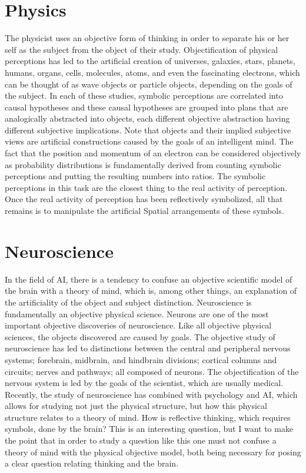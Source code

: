 \section{Physics}

The physicist uses an objective form of thinking in order to separate
his or her self as the subject from the object of their study.
Objectification of physical perceptions has led to the artificial
creation of universes, galaxies, stars, planets, humans, organs,
cells, molecules, atoms, and even the fascinating electrons, which can
be thought of as wave objects or particle objects, depending on the
goals of the subject.  In each of these studies, symbolic perceptions
are correlated into causal hypotheses and these causal hypotheses are
grouped into plans that are analogically abstracted into objects, each
different objective abstraction having different subjective
implications.  Note that objects and their implied subjective views
are artificial constructions caused by the goals of an intelligent
mind.  The fact that the position and momentum of an electron can be
considered objectively as probability distributions is fundamentally
derived from counting symbolic perceptions and putting the resulting
numbers into ratios.  The symbolic perceptions in this task are the
closest thing to the real activity of perception.  Once the real
activity of perception has been reflectively symbolized, all that
remains is to manipulate the artificial Spatial arrangements of these
symbols.

\section{Neuroscience}

In the field of AI, there is a tendency to confuse an objective
scientific model of the brain with a theory of mind, which is, among
other things, an explanation of the artificiality of the object and
subject distinction.  Neuroscience is fundamentally an objective
physical science.  Neurons are one of the most important objective
discoveries of neuroscience.  Like all objective physical sciences,
the objects discovered are caused by goals.  The objective study of
neuroscience has led to distinctions between the central and
peripheral nervous systems; forebrain, midbrain, and hindbrain
divisions; cortical columns and circuits; nerves and pathways; all
composed of neurons.  The objectification of the nervous system is led
by the goals of the scientist, which are usually medical.  Recently,
the study of neuroscience has combined with psychology and AI, which
allows for studying not just the physical structure, but how this
physical structure relates to a theory of mind.  How is reflective
thinking, which requires symbols, done by the brain?  This is an
interesting question, but I want to make the point that in order to
study a question like this one must not confuse a theory of mind with
the physical objective model, both being necessary for posing a clear
question relating thinking and the brain.

